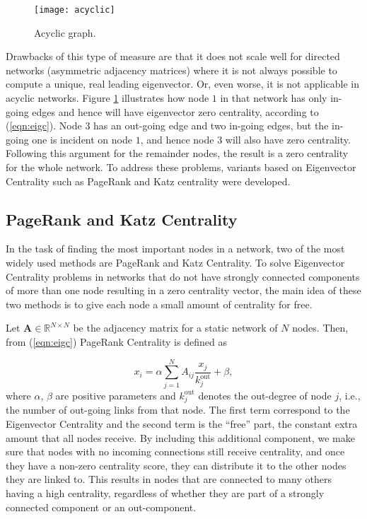 \begin{figure}[h]\centering
	\texttt{[image: acyclic]}
	\caption{Acyclic graph.}
	\label{fig:acyclic}
	\bigskip
\end{figure}

Drawbacks of this type of measure are that it does not scale well for directed networks (asymmetric adjacency matrices) where it is not always possible to compute a unique, real leading eigenvector. Or, even worse, it is not applicable in acyclic networks. Figure \ref{fig:acyclic} illustrates how node $1$ in that network has only in-going edges and hence will have eigenvector zero centrality, according to (\ref{eqn:eigc}). Node $3$ has an out-going edge and two in-going edges, but the in-going one is incident on node $1$, and hence node $3$ will also have zero centrality. Following this argument for the remainder nodes, the result is a zero centrality for the whole network. To address these problems, variants based on Eigenvector Centrality such as PageRank and Katz centrality were developed.

\subsection*{PageRank and Katz Centrality}
In the task of finding the most important nodes in a network, two of the most widely used methods are PageRank and Katz Centrality. To solve Eigenvector Centrality problems in networks that do not have strongly connected components of more than one node resulting in a zero centrality vector, the main idea of these two methods is to give each node a small amount of centrality for free. 

Let $\mathbf{A}\in\mathbb{R}^{N\times N}$ be the adjacency matrix for a static network of $N$ nodes. Then, from (\ref{eqn:eigc}) PageRank Centrality is defined as

\begin{equation}
\label{eqn:pr1}
    x_i= \alpha\sum_{j=1}^{N}A_{ij}\frac{x_j}{k_j^{\text{out}}} + \beta,
\end{equation}
where $\alpha$, $\beta$ are positive parameters and $k_j^{\text{out}}$ denotes the out-degree of node $j$, i.e., the number of out-going links from that node. The first term correspond to the Eigenvector Centrality and the second term is the “free” part, the constant extra amount that all nodes receive. By including this additional component, we make sure that nodes with no incoming connections still receive centrality, and once they have a non-zero centrality score, they can distribute it to the other nodes they are linked to. This results in nodes that are connected to many others having a high centrality, regardless of whether they are part of a strongly connected component or an out-component.

